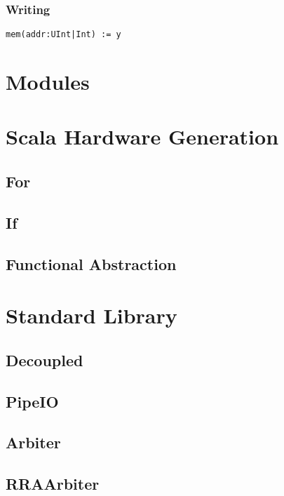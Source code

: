 \documentclass[10pt,landscape]{article}
\begin{document}
\begin{multicols}{3}
\subsubsection{Writing}
\verb$mem(addr:UInt|Int) := y$ \newline

\subsubsection{}

\section{Modules}

\section{Scala Hardware Generation}
\subsection{For}

\subsection{If}

\subsection{Functional Abstraction}

\section{Standard Library}
\subsection{Decoupled}
\subsection{PipeIO}
\subsection{Arbiter}
\subsection{RRAArbiter}


\end{multicols}
\end{document}
